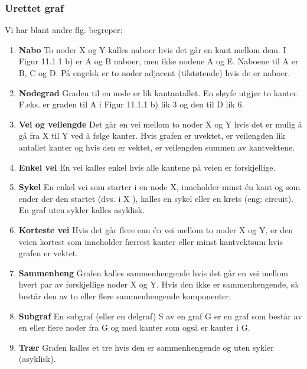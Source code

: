 \documentclass[11pt]{article}
\begin{document}
        \subsubsection{Urettet graf}
            Vi har blant andre flg. begreper:
            \begin{enumerate}
                \item \textbf{Nabo} To noder X og Y kalles naboer hvis det går en kant mellom dem. I Figur 11.1.1 b)
                    er A og B naboer, men ikke nodene A og E. Naboene til A er B, C og D. På engelsk er to
                    noder adjacent (tilstøtende) hvis de er naboer.
                \item \textbf{Nodegrad} Graden til en node er lik kantantallet. En sløyfe utgjør to kanter. F.eks. er
                    graden til A i Figur 11.1.1 b) lik 3 og den til D lik 6.
                \item \textbf{Vei og veilengde} Det går en vei mellom to noder X og Y hvis det er mulig å gå fra X
                    til Y ved å følge kanter. Hvis grafen er uvektet, er veilengden lik antallet kanter og hvis
                    den er vektet, er veilengden summen av kantvektene.
                \item \textbf{Enkel vei} En vei kalles enkel hvis alle kantene på veien er forskjellige.
                \item \textbf{Sykel} En enkel vei som starter i en node X, inneholder minst én kant og som ender der
                    den startet (dvs. i X ), kalles en sykel eller en krets (eng: circuit). En graf uten sykler
                    kalles asyklisk.
                \item \textbf{Korteste vei} Hvis det går flere enn én vei mellom to noder X og Y, er den veien
                    kortest som inneholder færrest kanter eller minst kantvektsum hvis grafen er vektet.
                \item \textbf{Sammenheng} Grafen kalles sammenhengende hvis det går en vei mellom hvert par av
                    forskjellige noder X og Y. Hvis den ikke er sammenhengende, så består den av to eller
                    flere sammenhengende komponenter.
                \item \textbf{Subgraf} En subgraf (eller en delgraf) S av en graf G er en graf som består av en eller
                    flere noder fra G og med kanter som også er kanter i G.
                \item \textbf{Trær} Grafen kalles et tre hvis den er sammenhengende og uten sykler (asyklisk).
            \end{enumerate}
\end{document}
